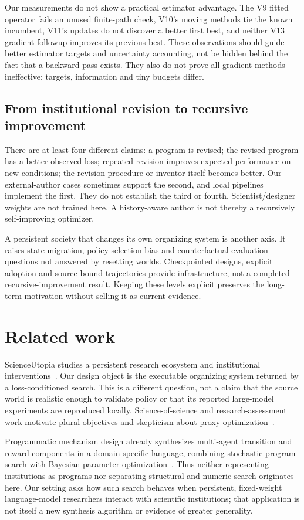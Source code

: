 Our measurements do not show a practical estimator advantage. The V9 fitted
operator fails an unused finite-path check, V10's moving methods tie the known
incumbent, V11's updates do not discover a better first best, and neither V13
gradient followup improves its previous best. These observations should guide
better estimator targets and uncertainty accounting, not be hidden behind
the fact that a backward pass exists. They also do not prove all gradient
methods ineffective: targets, information and tiny budgets differ.

\subsection{From institutional revision to recursive improvement}
There are at least four different claims: a program is revised; the revised
program has a better observed loss; repeated revision improves expected
performance on new conditions; the revision procedure or inventor itself
becomes better. Our external-author cases sometimes support the second, and
local pipelines implement the first. They do not establish the third or fourth.
Scientist/designer weights are not trained here. A history-aware author is
not thereby a recursively self-improving optimizer.

A persistent society that changes its own organizing system is another axis.
It raises state migration, policy-selection bias and counterfactual evaluation
questions not answered by resetting worlds. Checkpointed designs, explicit
adoption and source-bound trajectories provide infrastructure, not a completed
recursive-improvement result. Keeping these levels explicit preserves the
long-term motivation without selling it as current evidence.

\section{Related work}
ScienceUtopia studies a persistent research ecosystem and institutional
interventions~\citep{jin2026scienceutopia}. Our design object is the executable
organizing system returned by a loss-conditioned search. This is a different
question, not a claim that the source world is realistic enough to validate
policy or that its reported large-model experiments are reproduced locally.
Science-of-science and research-assessment work motivate plural objectives
and skepticism about proxy optimization~\citep{fortunato2018science,hicks2015leiden}.

Programmatic mechanism design already synthesizes multi-agent transition and
reward components in a domain-specific language, combining stochastic program
search with Bayesian parameter optimization~\citep{narayanaswami2022programmatic}.
Thus neither representing institutions as programs nor separating structural
and numeric search originates here. Our setting asks how such search behaves
when persistent, fixed-weight language-model researchers interact with
scientific institutions; that application is not itself a new synthesis
algorithm or evidence of greater generality.

